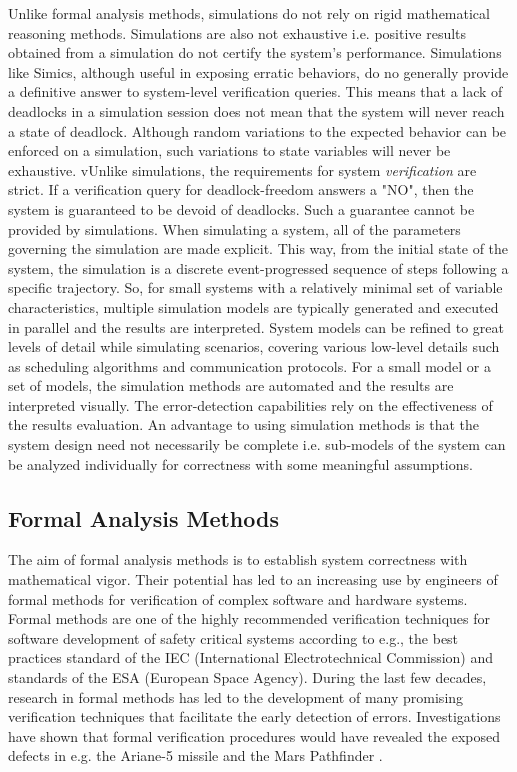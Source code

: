Unlike formal analysis methods, simulations do not rely on rigid mathematical reasoning methods. Simulations are also not exhaustive i.e. positive results obtained from a simulation do not certify the system's performance. Simulations like Simics, although useful in exposing erratic behaviors, do no generally provide a definitive answer to system-level verification queries. This means that a lack of deadlocks in a simulation session does not mean that the system will never reach a state of deadlock. Although random variations to the expected behavior can be enforced on a simulation, such variations to state variables will never be exhaustive. vUnlike simulations, the requirements for system \emph{verification} are strict. If a verification query for deadlock-freedom answers a "NO", then the system is guaranteed to be devoid of deadlocks. Such a guarantee cannot be provided by simulations. When simulating a system, all of the parameters governing the simulation are made explicit. This way, from the initial state of the system, the simulation is a discrete event-progressed sequence of steps following a specific trajectory. So, for small systems with a relatively minimal set of variable characteristics, multiple simulation models are typically generated and executed in parallel and the results are interpreted. System models can be refined to great levels of detail while simulating scenarios, covering various low-level details such as scheduling algorithms and communication protocols. For a small model or a set of models, the simulation methods are automated and the results are interpreted visually. The error-detection capabilities rely on the effectiveness of the results evaluation. An advantage to using simulation methods is that the system design need not necessarily be complete i.e. sub-models of the system can be analyzed individually for correctness with some meaningful assumptions.

\subsection{Formal Analysis Methods}

The aim of formal analysis methods is to establish system correctness with mathematical vigor. Their potential has led to an increasing use by engineers of formal methods for verification of complex software and hardware systems. Formal methods are one of the highly recommended verification techniques for software development of safety critical systems according to e.g., the best practices standard of the IEC (International Electrotechnical Commission) and standards of the ESA (European Space Agency). During the last few decades, research in formal methods has led to the development of many promising verification techniques that facilitate the early detection of errors. Investigations have shown that formal verification procedures would have revealed the exposed defects in e.g. the Ariane-5 missile \cite{lions1996ariane} and the Mars Pathfinder \cite{jones1997really, morrison1996board}. 

